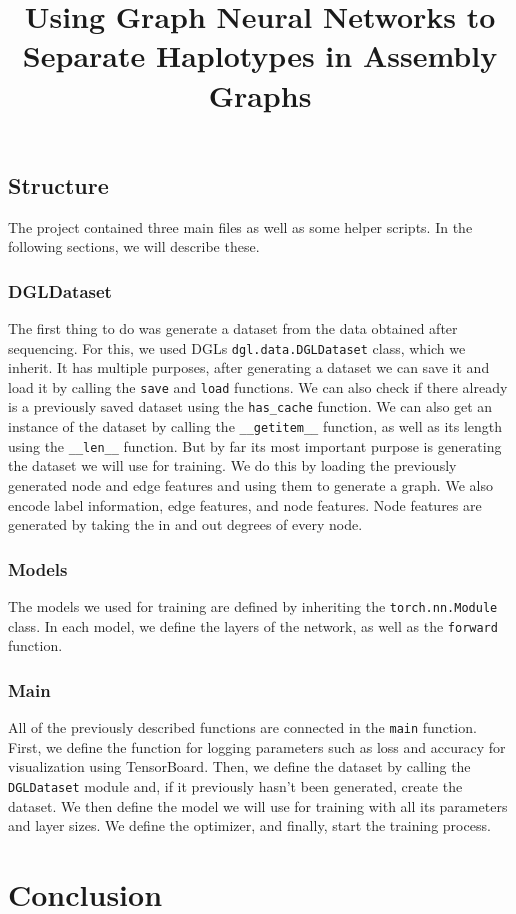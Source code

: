 \documentclass[times, utf8, diplomski, english]{fer_eng}
\begin{document}
\section{Structure}

The project contained three main files as well as some helper scripts. In the following sections, we will describe these.

\subsection{DGLDataset}

The first thing to do was generate a dataset from the data obtained after sequencing. For this, we used DGLs \texttt{dgl.data.DGLDataset} class, which we inherit. It has multiple purposes, after generating a dataset we can save it and load it by calling the \texttt{save} and \texttt{load} functions. We can also check if there already is a previously saved dataset using the \texttt{has\_cache} function. We can also get an instance of the dataset by calling the \texttt{\_\_getitem\_\_} function, as well as its length using the \texttt{\_\_len\_\_} function. But by far its most important purpose is generating the dataset we will use for training. We do this by loading the previously generated node and edge features and using them to generate a graph. We also encode label information, edge features, and node features. Node features are generated by taking the in and out degrees of every node.

\subsection{Models}

The models we used for training are defined by inheriting the \texttt{torch.nn.Module} class. In each model, we define the layers of the network, as well as the \texttt{forward} function.

\subsection{Main}

All of the previously described functions are connected in the \texttt{main} function. First, we define the function for logging parameters such as loss and accuracy for visualization using TensorBoard. Then, we define the dataset by calling the \texttt{DGLDataset} module and, if it previously hasn't been generated, create the dataset. We then define the model we will use for training with all its parameters and layer sizes. We define the optimizer, and finally, start the training process.

\chapter{Conclusion}




\clearpage

\title{Using Graph Neural Networks to Separate Haplotypes in Assembly Graphs}
\begin{abstract}

\keywords{}
\end{abstract}

\hrtitle{}
\begin{sazetak}

\kljucnerijeci{}
\end{sazetak}
\end{document}
